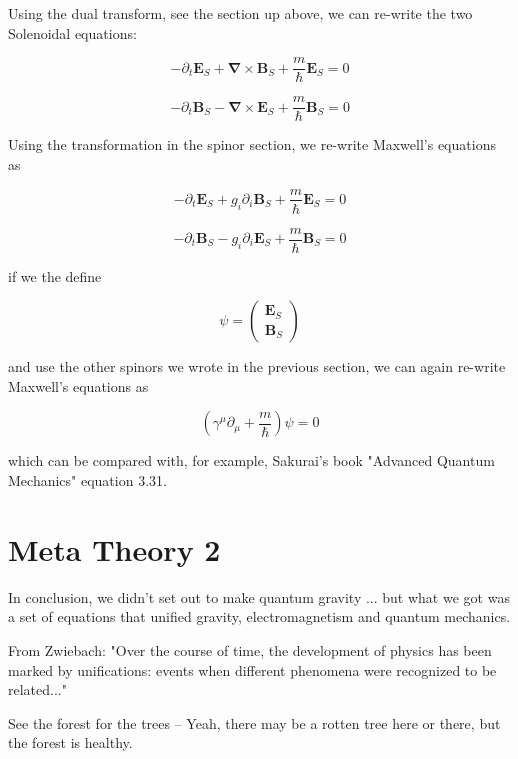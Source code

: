 \documentclass {article}
\renewcommand\vec{\mathbf}
\let\OldS\nabla
\renewcommand{\nabla}{\boldsymbol{\OldS}}
\begin{document}
Using the dual transform, see the section up above, we can re-write the two Solenoidal equations:

$$-\partial_t \vec E_S + \nabla \times \vec B_S   +\frac m {\hbar} \vec E_S = 0 $$ 

$$ -\partial_t \vec B_S - \nabla \times \vec E_S   +\frac m {\hbar} \vec B_S = 0$$ 


Using the transformation in the spinor section, we  re-write Maxwell's equations as 

$$-\partial_t \vec E_S + g_i \partial_i \vec B_S   +\frac m {\hbar} \vec E_S = 0 $$ 

$$ -\partial_t \vec B_S - g_i \partial_i \vec E_S   +\frac m {\hbar} \vec B_S = 0 $$ 


if we the define 

$$\psi = \left(\begin{matrix}  \vec E_S \\ \vec B_S \end{matrix}\right) $$

and use the other spinors we wrote in the previous section, we can again re-write Maxwell's equations as

$$\left(\gamma^{\mu} \partial_{\mu} + \frac m {\hbar} \right) \psi = 0 $$

which can be compared with, for example, Sakurai's book "Advanced Quantum Mechanics" equation 3.31.

\newpage

\section{Meta Theory 2}
In conclusion, we didn't set out to make quantum gravity ... but what we got was a set of equations that unified gravity, electromagnetism and quantum mechanics.

From Zwiebach: "Over the course of time, the development of physics has been marked by unifications: events when different phenomena were recognized to be related..."


See the forest for the trees -- Yeah, there may be a rotten tree here or there, but the forest is healthy.
\newpage
\end{document}
